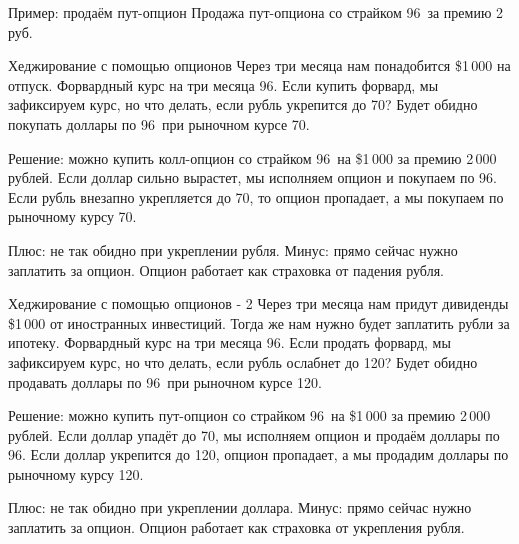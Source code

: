 \documentclass{beamer}
\newcommand{\usdrubstrike}{96}
\newcommand{\usdrubaxisspread}{8}
\newcommand{\usdrublow}{70}
\newcommand{\usdrubhigh}{120}
\begin{document}
\begin{frame}{Пример: продаём пут-опцион}
\justifying
Продажа пут-опциона со страйком \usdrubstrike\ за премию 2 руб.

\justifying
\centering
\end{frame}



\begin{frame}{Хеджирование с помощью опционов}
\justify
Через три месяца нам понадобится \$1\,000 на отпуск. Форвардный курс на три месяца \usdrubstrike. Если купить форвард, мы зафиксируем курс, но что делать, если рубль укрепится до \usdrublow? Будет обидно покупать доллары по \usdrubstrike\ при рыночном курсе \usdrublow.

\justify
Решение: можно купить колл-опцион со страйком \usdrubstrike\ на \$1\,000 за премию 2\,000 рублей. Если доллар сильно вырастет, мы исполняем опцион и покупаем по \usdrubstrike. Если рубль внезапно укрепляется до \usdrublow, то опцион пропадает, а мы покупаем по рыночному курсу \usdrublow.

\justify
Плюс: не так обидно при укреплении рубля. Минус: прямо сейчас нужно заплатить за опцион. Опцион работает как страховка от падения рубля.
\end{frame}




\begin{frame}{Хеджирование с помощью опционов - 2}
\justify
Через три месяца нам придут дивиденды \$1\,000 от иностранных инвестиций. Тогда же нам нужно будет заплатить рубли за ипотеку. Форвардный курс на три месяца \usdrubstrike. Если продать форвард, мы зафиксируем курс, но что делать, если рубль ослабнет до \usdrubhigh? Будет обидно продавать доллары по \usdrubstrike\ при рыночном курсе \usdrubhigh.

\justify
Решение: можно купить пут-опцион со страйком \usdrubstrike\ на \$1\,000 за премию 2\,000 рублей. Если доллар упадёт до \usdrublow, мы исполняем опцион и продаём доллары по \usdrubstrike. Если доллар укрепится до \usdrubhigh, опцион пропадает, а мы продадим доллары по рыночному курсу \usdrubhigh.

\justify
Плюс: не так обидно при укреплении доллара. Минус: прямо сейчас нужно заплатить за опцион. Опцион работает как страховка от укрепления рубля.
\end{frame}
\end{document}
